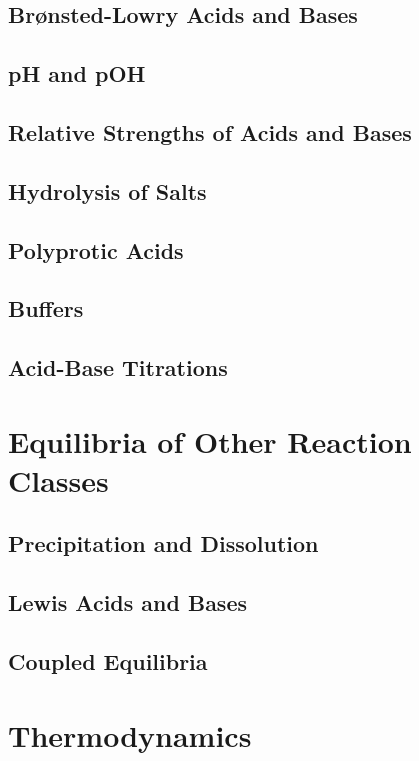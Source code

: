 \documentclass[12pt, openany, letterpaper]{memoir}
\begin{document}
\section{Brønsted-Lowry Acids and Bases}

\section{pH and pOH}

\section{Relative Strengths of Acids and Bases}

\section{Hydrolysis of Salts}

\section{Polyprotic Acids}

\section{Buffers}

\section{Acid-Base Titrations}

\chapter{Equilibria of Other Reaction Classes}

\section{Precipitation and Dissolution}

\section{Lewis Acids and Bases}

\section{Coupled Equilibria}

\chapter{Thermodynamics}
\end{document}

